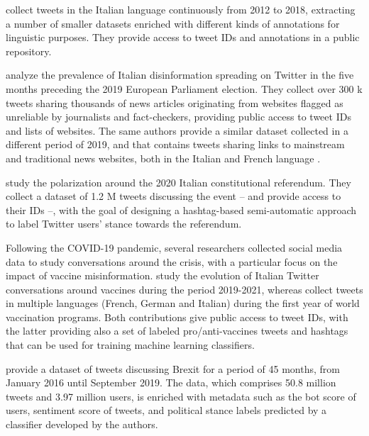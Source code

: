 \documentclass[letterpaper]{article} %
\begin{document}
\cite{valerio2018long} collect tweets in the Italian language continuously from 2012 to 2018, extracting a number of smaller datasets enriched with different kinds of annotations for linguistic purposes. They provide access to tweet IDs and annotations in a public repository.

\cite{PierriArtoni2020} analyze the prevalence of Italian disinformation spreading on Twitter in the five months preceding the 2019 European Parliament election. They collect over 300 k tweets sharing thousands of news articles originating from websites flagged as unreliable by journalists and fact-checkers, providing public access to tweet IDs and lists of websites. The same authors provide a similar dataset collected in a different period of 2019, and that contains tweets sharing links to mainstream and traditional news websites, both in the Italian and French language \cite{pierri2020diffusion}.

\cite{di2021content} study the polarization around the 2020 Italian constitutional referendum. They collect a dataset of 1.2 M tweets discussing the event -- and provide access to their IDs --, with the goal of designing a hashtag-based semi-automatic approach to label Twitter users' stance towards the referendum.

Following the COVID-19 pandemic, several researchers collected social media data to study conversations around the crisis, with a particular focus on the impact of vaccine misinformation. \cite{crupi2022echoes} study the evolution of Italian Twitter conversations around vaccines during the period 2019-2021,
whereas \cite{di2022vaccineu} collect tweets in multiple languages (French, German and Italian) during the first year of world vaccination programs. Both contributions give public access to tweet IDs, with the latter providing also a set of labeled pro/anti-vaccines tweets and hashtags that can be used for training machine learning classifiers.

\cite{calisir2020long} provide a dataset of tweets discussing Brexit for a period of 45 months, from January 2016 until September 2019. The data, which comprises 50.8 million tweets and 3.97 million users, is enriched with metadata such as the bot score of users, sentiment score of tweets, and political stance labels predicted by a classifier developed by the authors.
\end{document}
